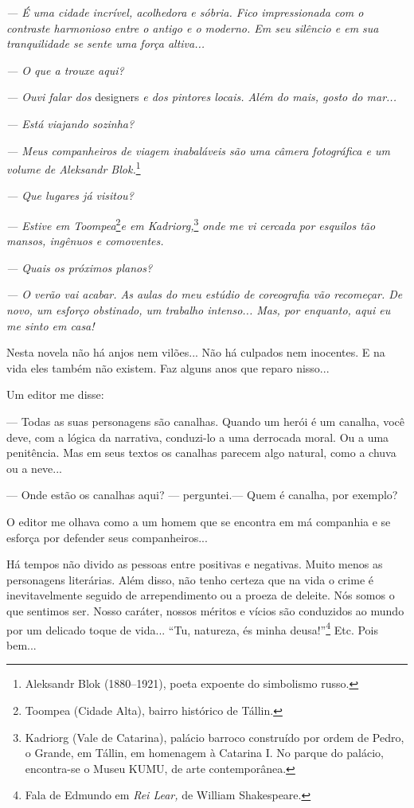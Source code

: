 \emph{--- É uma cidade incrível, acolhedora e sóbria. Fico impressionada
com o contraste harmonioso entre o antigo e o moderno. Em seu silêncio e
em sua tranquilidade se sente uma força altiva...}

\emph{--- O que a trouxe aqui?}

\emph{--- Ouvi falar dos} designers \emph{e dos pintores locais. Além do
mais, gosto do mar...}

\emph{--- Está viajando sozinha?}

\emph{--- Meus companheiros de viagem inabaláveis são uma câmera
fotográfica e um volume de Aleksandr Blok.}\footnote{Aleksandr Blok
  (1880--1921), poeta expoente do simbolismo russo.}

\emph{--- Que lugares já visitou?}

\emph{--- Estive em Toompea}\footnote{Toompea (Cidade Alta), bairro
  histórico de Tállin.}\emph{e em Kadriorg,}\footnote{Kadriorg (Vale de
  Catarina), palácio barroco construído por ordem de Pedro, o Grande, em
  Tállin, em homenagem à Catarina I. No parque do palácio, encontra-se o
  Museu KUMU, de arte contemporânea.} \emph{onde me vi cercada por
esquilos tão mansos, ingênuos e comoventes.}

\emph{--- Quais os próximos planos?}

\emph{--- O verão vai acabar. As aulas do meu estúdio de coreografia vão
recomeçar. De novo, um esforço obstinado, um trabalho intenso... Mas,
por enquanto, aqui eu me sinto em casa!}

Nesta novela não há anjos nem vilões... Não há culpados nem inocentes. E
na vida eles também não existem. Faz alguns anos que reparo nisso...

Um editor me disse:

--- Todas as suas personagens são canalhas. Quando um herói é um
canalha, você deve, com a lógica da narrativa, conduzi-lo a uma
derrocada moral. Ou a uma penitência. Mas em seus textos os canalhas
parecem algo natural, como a chuva ou a neve...

--- Onde estão os canalhas aqui? --- perguntei.--- Quem é canalha, por
exemplo?

O editor me olhava como a um homem que se encontra em má companhia e se
esforça por defender seus companheiros...

Há tempos não divido as pessoas entre positivas e negativas. Muito menos
as personagens literárias. Além disso, não tenho certeza que na vida o
crime é inevitavelmente seguido de arrependimento ou a proeza de
deleite. Nós somos o que sentimos ser. Nosso caráter, nossos méritos e
vícios são conduzidos ao mundo por um delicado toque de vida... ``Tu,
natureza, és minha deusa!''\footnote{Fala de Edmundo em \emph{Rei Lear,}
  de William Shakespeare.} Etc. Pois bem...

